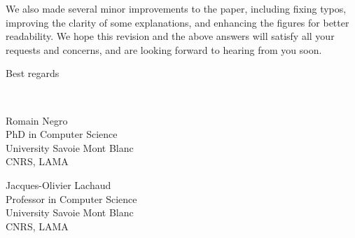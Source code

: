 \documentclass[10pt,french]{letter}
\begin{document}
  We also made several minor improvements to the paper, including fixing typos, improving the clarity of some
  explanations, and enhancing the figures for better readability. We hope this revision and the above answers
  will satisfy all your requests and concerns, and are looking forward to hearing from you soon.

  Best regards
  \bigskip

  \mbox{~}
  \hfill
  \begin{minipage}{0.32\textwidth}
    Romain Negro \\
    PhD in Computer Science\\
    University Savoie Mont Blanc\\
    CNRS, LAMA
  \end{minipage}
  \hfill
  \begin{minipage}{0.32\textwidth}
    Jacques-Olivier Lachaud\\
    Professor in Computer Science\\
    University Savoie Mont Blanc\\
    CNRS, LAMA
  \end{minipage}
  \hfill
  \mbox{~}
\end{document}

